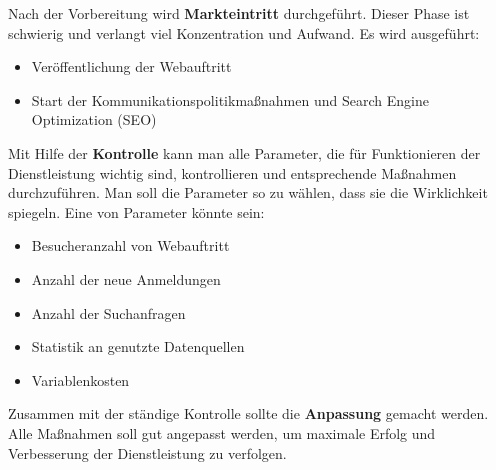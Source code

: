 Nach der Vorbereitung wird \textbf{Markteintritt} durchgeführt. Dieser Phase ist schwierig und verlangt viel Konzentration und Aufwand. Es wird ausgeführt:
\begin{itemize}
\item Veröffentlichung der Webauftritt 
\item Start der Kommunikationspolitikmaßnahmen und Search Engine Optimization (SEO)
\end{itemize}

Mit Hilfe der \textbf{Kontrolle} kann man alle Parameter, die für Funktionieren der Dienstleistung wichtig sind, kontrollieren und entsprechende Maßnahmen durchzuführen. Man soll die Parameter so zu wählen, dass sie die Wirklichkeit spiegeln. Eine von Parameter könnte sein:
\begin{itemize}
\item Besucheranzahl von Webauftritt 
\item Anzahl der neue Anmeldungen 
\item Anzahl der Suchanfragen
\item Statistik an genutzte Datenquellen
\item Variablenkosten 
\end{itemize}

Zusammen mit der ständige Kontrolle sollte die \textbf{Anpassung} gemacht werden. Alle Maßnahmen soll gut angepasst werden, um maximale Erfolg und Verbesserung der Dienstleistung zu verfolgen.

